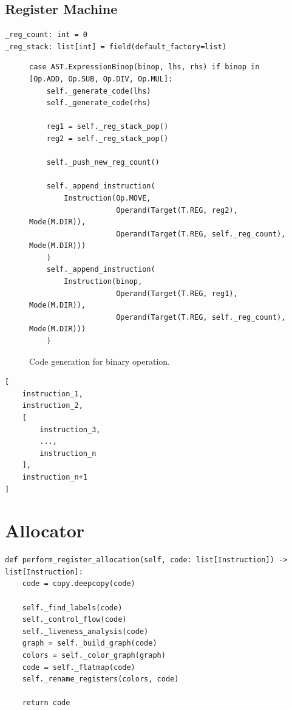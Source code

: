 \newpage


\subsection{Register Machine}
\cite{ModernCompilerImplementation}
\begin{verbatim}
_reg_count: int = 0
_reg_stack: list[int] = field(default_factory=list)
\end{verbatim}

\begin{figure}
\begin{verbatim}
case AST.ExpressionBinop(binop, lhs, rhs) if binop in [Op.ADD, Op.SUB, Op.DIV, Op.MUL]:
    self._generate_code(lhs)
    self._generate_code(rhs)

    reg1 = self._reg_stack_pop()
    reg2 = self._reg_stack_pop()

    self._push_new_reg_count()

    self._append_instruction(
        Instruction(Op.MOVE,
                    Operand(Target(T.REG, reg2), Mode(M.DIR)),
                    Operand(Target(T.REG, self._reg_count), Mode(M.DIR)))
    )
    self._append_instruction(
        Instruction(binop,
                    Operand(Target(T.REG, reg1), Mode(M.DIR)),
                    Operand(Target(T.REG, self._reg_count), Mode(M.DIR)))
    )
\end{verbatim}
\caption{Code generation for binary operation.}
\label{fig:binop}
\end{figure}

\begin{verbatim}
[
    instruction_1,
    instruction_2,
    [
        instruction_3,
        ..., 
        instruction_n
    ],
    instruction_n+1
]
\end{verbatim}

\newpage

\section{Allocator}

\begin{verbatim}
def perform_register_allocation(self, code: list[Instruction]) -> list[Instruction]:
    code = copy.deepcopy(code)

    self._find_labels(code)
    self._control_flow(code)
    self._liveness_analysis(code)
    graph = self._build_graph(code)
    colors = self._color_graph(graph)
    code = self._flatmap(code)
    self._rename_registers(colors, code)

    return code
\end{verbatim}

